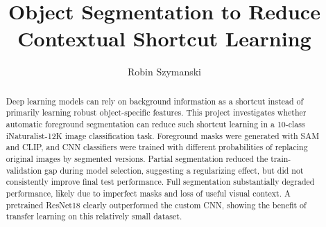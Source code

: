\documentclass[sigconf, nonacm]{acmart}
\begin{document}
\title{Object Segmentation to Reduce Contextual Shortcut Learning}

\author{Robin Szymanski}

\begin{abstract}
Deep learning models can rely on background information as a shortcut instead of primarily learning robust object-specific features. This project investigates whether automatic foreground segmentation can reduce such shortcut learning in  a 10-class iNaturalist-12K image classification task. 
Foreground masks were generated with SAM and CLIP, and CNN classifiers were trained with different probabilities of replacing original images by segmented versions. 
Partial segmentation reduced the train-validation gap during model selection, suggesting a regularizing effect, but did not consistently improve final test performance. 
Full segmentation substantially degraded performance, likely due to imperfect masks and loss of useful visual context. A pretrained ResNet18 clearly outperformed the custom CNN, showing the benefit of transfer learning on this relatively small dataset.
\end{abstract}

\maketitle
\end{document}
